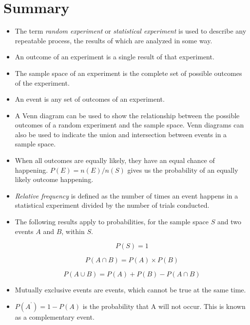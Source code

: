             \section{ Summary}
            \nopagebreak
            \label{m39373*eip-106}\begin{itemize}[noitemsep]
            \item The
term \textsl{random experiment} or \textsl{statistical experiment} is used to describe any
repeatable process, the results of which are analyzed in some way.\item 
An outcome of an experiment is a single result of that experiment.\item 
The sample space of an experiment is the complete set of possible outcomes of
the experiment.\item 
An event is any set of outcomes of an experiment.\item 
A Venn diagram can be used to show the relationship between the possible
outcomes of a random experiment and the sample space. Venn diagrams can also be
used to indicate the union and intersection between events in a sample space.
\item 
When all outcomes are equally likely, they have an equal chance of happening.
$P\left(E\right)=n\left(E\right)/n\left(S\right)$ gives us the
probability of an equally likely outcome happening.\item 
\textsl{Relative frequency} is defined as the
number of times an event happens in a statistical experiment divided by the
number of trials conducted.\item The following results apply to probabilities, for the sample space $S$ and two events $A$ and $B$, within $S$.
      \label{m39373*uid3457}\nopagebreak\noindent{}
        
    \begin{equation}
    P\left(S\right)=1\tag{11.12}
      \end{equation}
      \label{m39373*uid5853}\nopagebreak\noindent{}
        
    \begin{equation}
    P\left(A\cap B\right)=P\left(A\right)\ensuremath{\times}P\left(B\right)\tag{11.13}
      \end{equation}
      \label{m39373*uid4559}\nopagebreak\noindent{}
        
    \begin{equation}
    P\left(A\cup B\right)=P\left(A\right)+P\left(B\right)-P\left(A\cap B\right)\tag{11.14}
      \end{equation}
\item 
Mutually exclusive events are events, which cannot be true at the same
time.\item 
$P\left({A}^{\text{'}}\right)=1-P\left(A\right)$ is the probability that A will not occur. This is known as a
complementary event.\end{itemize}
